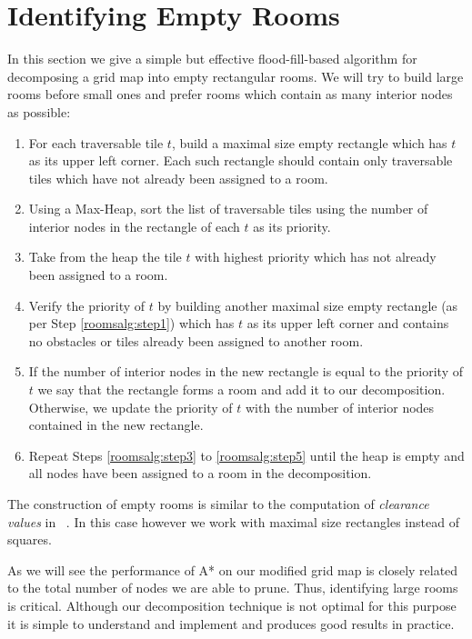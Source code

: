 \section{Identifying Empty Rooms}
\label{empty rooms}
In this section we give a simple but effective flood-fill-based algorithm for decomposing a 
grid map into empty rectangular rooms.
We will try to build large rooms before small ones and prefer rooms which
contain as many interior nodes as possible:

\begin{enumerate}

\item{\label{rooms_alg:step1} For each traversable tile $t$, build a maximal size empty
rectangle which has $t$ as its upper left corner. Each such rectangle should contain only
traversable tiles which have not already been assigned to a room.}

\item{\label{rooms_alg:step2} Using a Max-Heap, sort the list of traversable tiles using the number of
interior nodes in the rectangle of each $t$ as its priority.}

\item{\label{roomsalg:step3} Take from the heap the tile $t$ with highest priority
which has not already been assigned to a room. }

\item{\label{rommsalg:step4} Verify the priority of $t$ by building another maximal size
empty rectangle (as per Step \ref{roomsalg:step1}) which has $t$ as its upper
left corner and contains no obstacles or tiles already been assigned to another room.}

\item{\label{roomsalg:step5} If the number of interior nodes in the new rectangle is equal to the 
priority of $t$ we say that the rectangle forms a room and add it to our decomposition. 
Otherwise, we update the priority of $t$ with the number of interior 
nodes contained in the new rectangle. }

\item{\label{step6} Repeat Steps \ref{roomsalg:step3} to \ref{roomsalg:step5} until the heap is
empty and all nodes have been assigned to a room in the decomposition.}

\end{enumerate}

The construction of empty rooms is similar to the computation of \emph{clearance
values} in \citeauthor{harabor08}~. 
In this case however we work with maximal size rectangles instead of squares. 
\par
As we will see the performance of A* on our modified grid map is closely related to the total 
number of nodes we are able to prune.
Thus, identifying large rooms is critical.
Although our decomposition technique is not optimal for this purpose it is simple
to understand and implement and produces good results in practice.
